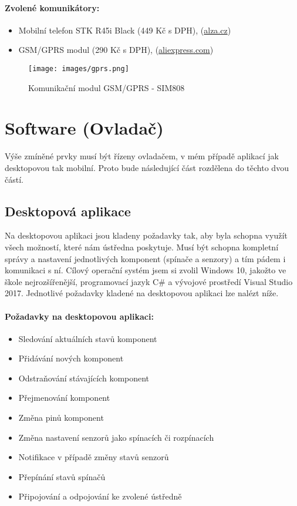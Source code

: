 \documentclass[FM,MP]{tulthesis}  %
\begin{document}
\paragraph{Zvolené komunikátory:}
\begin{itemize}
\item Mobilní telefon STK R45i Black (449 Kč s DPH), (\url{alza.cz})
\item GSM/GPRS modul (290 Kč s DPH), (\url{aliexpress.com})
\end{itemize} 

\begin{figure}[H]
\begin{center}
\texttt{[image: images/gprs.png]}
\caption{Komunikační modul GSM/GPRS - SIM808}
\label{image}
\end{center}
\end{figure}

\section{Software (Ovladač)}
Výše zmíněné prvky musí  být řízeny ovladačem, v mém případě aplikací jak desktopovou tak mobilní. Proto bude následující část rozdělena do těchto dvou částí.

\subsection{Desktopová aplikace}
Na desktopovou aplikaci jsou kladeny požadavky tak, aby byla schopna využít všech možností, které nám ústředna poskytuje. Musí být schopna kompletní správy a nastavení jednotlivých komponent (spínače a senzory) a tím pádem i komunikaci s ní. Cílový operační systém jsem si zvolil Windows 10, jakožto ve škole nejrozšířenější, programovací jazyk C\# a vývojové prostředí Visual Studio 2017. Jednotlivé požadavky kladené na desktopovou aplikaci lze nalézt níže.

\paragraph{Požadavky na desktopovou aplikaci:}
\begin{itemize}
\item Sledování aktuálních stavů komponent
\item Přidávání nových komponent
\item Odstraňování stávajících komponent
\item Přejmenování komponent
\item Změna pinů komponent
\item Změna nastavení senzorů jako spínacích či rozpínacích
\item Notifikace v případě změny stavů senzorů
\item Přepínání stavů spínačů
\item Připojování a odpojování ke zvolené ústředně
\end{itemize} 
\end{document}
